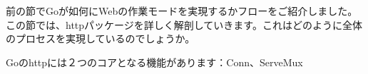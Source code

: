 前の節でGoが如何にWebの作業モードを実現するかフローをご紹介しました。この節では、httpパッケージを詳しく解剖していきます。これはどのように全体のプロセスを実現しているのでしょうか。

Goのhttpには２つのコアとなる機能があります：Conn、ServeMux
